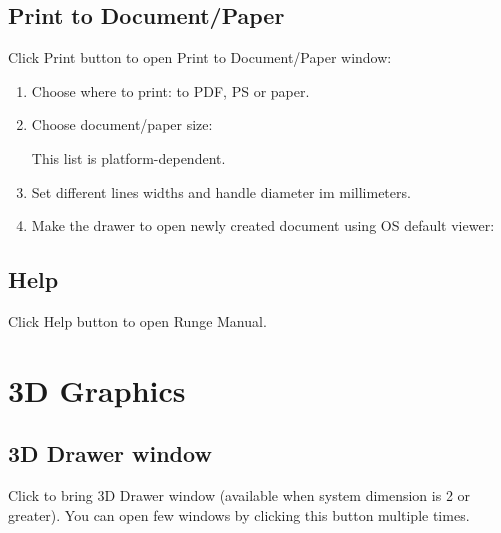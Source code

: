 \documentclass[12pt]{article}
\begin{document}
\subsection{Print to Document/Paper}

Click Print button  to open Print to Document/Paper window:


\begin{enumerate}
\item Choose where to print: to PDF, PS or paper.
\item Choose document/paper size:


This list is platform-dependent.

\item Set different lines widths and handle diameter im millimeters.

\item Make the drawer to open newly created document using OS default viewer:


\end{enumerate}


\subsection{Help}

Click Help button  to open Runge Manual.








\section{3D Graphics}

\subsection{3D Drawer window}

Click  to bring 3D Drawer window (available when system dimension is 2 or greater). 
You can open few windows by clicking this button multiple times.

\end{document}
